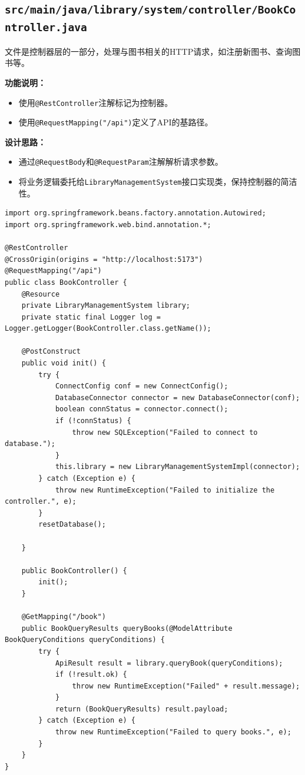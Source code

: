 \documentclass{ctexart}
\begin{document}
\subsection{\texttt{src/main/java/library/system/controller/BookController.java}}
文件是控制器层的一部分，处理与图书相关的HTTP请求，如注册新图书、查询图书等。

\textbf{功能说明：}
\begin{itemize}

    \item 使用\texttt{@RestController}注解标记为控制器。
    \item 使用\texttt{@RequestMapping("/api")}定义了API的基路径。
\end{itemize}

\textbf{设计思路：}
\begin{itemize}
    \item 通过\texttt{@RequestBody}和\texttt{@RequestParam}注解解析请求参数。
    \item 将业务逻辑委托给\texttt{LibraryManagementSystem}接口实现类，保持控制器的简洁性。
\end{itemize}

\begin{lstlisting}[caption=\texttt{library.system.controller/BookController.java}]
import org.springframework.beans.factory.annotation.Autowired;
import org.springframework.web.bind.annotation.*;

@RestController
@CrossOrigin(origins = "http://localhost:5173")
@RequestMapping("/api")
public class BookController {
    @Resource
    private LibraryManagementSystem library;
    private static final Logger log = Logger.getLogger(BookController.class.getName());

    @PostConstruct
    public void init() {
        try {
            ConnectConfig conf = new ConnectConfig();
            DatabaseConnector connector = new DatabaseConnector(conf);
            boolean connStatus = connector.connect();
            if (!connStatus) {
                throw new SQLException("Failed to connect to database.");
            }
            this.library = new LibraryManagementSystemImpl(connector);
        } catch (Exception e) {
            throw new RuntimeException("Failed to initialize the controller.", e);
        }
        resetDatabase();

    }

    public BookController() {
        init();
    }

    @GetMapping("/book")
    public BookQueryResults queryBooks(@ModelAttribute BookQueryConditions queryConditions) {
        try {
            ApiResult result = library.queryBook(queryConditions);
            if (!result.ok) {
                throw new RuntimeException("Failed" + result.message);
            }
            return (BookQueryResults) result.payload;
        } catch (Exception e) {
            throw new RuntimeException("Failed to query books.", e);
        }
    }
}
\end{lstlisting}
\end{document}
